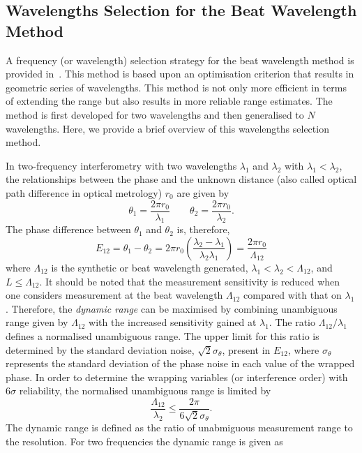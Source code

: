 \subsection{Wavelengths Selection for the Beat Wavelength Method}
A frequency (or wavelength) selection strategy for the beat wavelength method is provided in~\cite{Towers_frequency_selection_interferometry_2003}. This method is based upon an optimisation criterion that results in geometric series of wavelengths. This method is not only more efficient in terms of extending the range but also results in more reliable range estimates. The method is first developed for two wavelengths and then generalised to $N$ wavelengths. Here, we provide a brief overview of this wavelengths selection method.

In two-frequency interferometry with two wavelengths $\lambda_1$ and $\lambda_2$ with $\lambda_1 < \lambda_2$, the relationships between the phase and the unknown distance (also called optical path difference in optical metrology) $r_0$ are given by
\[
\theta_1 = \frac{2\pi r_0}{\lambda_1} \qquad \theta_2 = \frac{2\pi r_0}{\lambda_2}.
\]
The phase difference between $\theta_1$ and $\theta_2$ is, therefore,
\[
E_{12} = \theta_1 - \theta_2 = 2\pi r_0 \left(  \frac{\lambda_2 - \lambda_1}{\lambda_2\lambda_1}   \right)= \frac{2\pi r_0}{\Lambda_{12}}
\]
where $\Lambda_{12}$ is the synthetic or beat wavelength generated, $\lambda_1 < \lambda_2 <\Lambda_{12}$, and $L \leq \Lambda_{12}$. It should be noted that the measurement sensitivity is reduced when one considers measurement at the beat wavelength $\Lambda_{12}$ compared with that on $\lambda_1$. Therefore, the \emph{dynamic range} can be maximised by combining unambiguous range given by $\Lambda_{12}$ with the increased sensitivity gained at $\lambda_1$. The ratio $\Lambda_{12}/\lambda_1$ defines a normalised unambiguous range. The upper limit for this ratio is determined by the standard deviation noise, $\sqrt{2}\sigma_{\theta}$, present in $E_{12}$, where $\sigma_{\theta}$ represents the standard deviation of the phase noise in each value of the wrapped phase. In order to determine the wrapping variables (or interference order) with $6\sigma$ reliability, the normalised unambiguous range is limited by~\cite{Towers_frequency_selection_interferometry_2003}
\begin{equation}\label{norml-range-2-freq}
\frac{\Lambda_{12}}{\lambda_2} \leq \dfrac{2 \pi}{6\sqrt{2}\sigma_{\theta}}.
\end{equation}
The dynamic range is defined as the ratio of unabmiguous measurement range to the resolution. For two frequencies the dynamic range is given as~\cite{Towers_frequency_selection_interferometry_2003}
